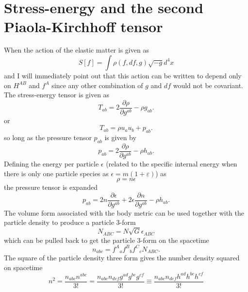 \section{Stress-energy and the second Piaola-Kirchhoff tensor}
 When the action of the elastic matter is given as
\begin{equation}
\label{eqn:action}
S[f] = \int{\rho(f,df,g)\sqrt{-g}d^4x}
\end{equation}
and I will immediately point out that this action can be written to depend only on $H^{AB}$ and $f^A$ since any other combination of $g$ and $df$ would not be covariant. The stress-energy tensor is given as
\begin{equation}
T_{ab} = 2 \frac{\partial\rho}{\partial g^{ab}} - \rho g_{ab}.
\end{equation}
or
\begin{equation}
T_{ab} =  \rho u_au_b + p_{ab}.
\end{equation}
so long as the pressure tensor $p_{ab}$ is given by
\begin{equation}
\label{eqn:pressureDefinition}
p_{ab} = 2 \frac{\partial\rho}{\partial g^{ab}} - \rho h_{ab}.
\end{equation}
Defining the energy per particle $\epsilon$ (related to the specific internal energy when there is only one particle species as $\epsilon = m(1 + \varepsilon)$) as
\begin{equation}
\rho = n\epsilon
\end{equation}
the pressure tensor is expanded
\begin{equation}
p_{ab} = 2 n\frac{\partial\epsilon}{\partial g^{ab}} + 2 \epsilon\frac{\partial n}{\partial g^{ab}} - \rho h_{ab}.
\end{equation}
The volume form associated with the body metric can be used together with the particle density to produce a particle 3-form
\begin{equation}
N_{ABC} = N \sqrt{G}\epsilon_{ABC}
\end{equation}
which can be pulled back to get the particle 3-form on the spacetime
\begin{equation}
n_{abc} = f^{A}{}_{a}f^{B}{}_{b}f^{C}{}_{c}N_{ABC}.
\end{equation}
The square of the particle density three form gives the number density squared on spacetime
\begin{equation}
n^2 = \frac{n_{abc}n^{abc}}{3!} = \frac{n_{abc}n_{def}g^{ad}g^{be}g^{cf}}{3!} \equiv \frac{n_{abc}n_{def}h^{ad}h^{be}h^{cf}}{3!}
\end{equation}
